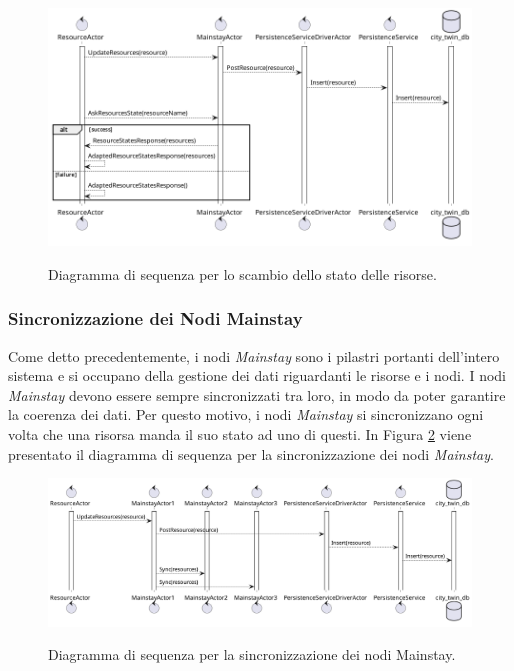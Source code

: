 \documentclass{scrartcl}
\begin{document}
\begin{figure}[H]
    \caption{Diagramma di sequenza per lo scambio dello stato delle risorse.}
    \includegraphics[width=\textwidth]{../assets/images/core-resource-state-exchange-sequence-diagram.png}
    \label{fig:core-resource-state-exchange-sequence-diagram}
\end{figure}

\subsubsection{Sincronizzazione dei Nodi Mainstay}

Come detto precedentemente, i nodi \textit{Mainstay} sono i pilastri portanti dell'intero sistema e si occupano della gestione dei dati riguardanti le risorse e i nodi. I nodi \textit{Mainstay} devono essere sempre sincronizzati tra loro, in modo da poter garantire la coerenza dei dati. Per questo motivo, i nodi \textit{Mainstay} si sincronizzano ogni volta che una risorsa manda il suo stato ad uno di questi. In Figura \ref{fig:core-mainstays-sync-sequence-diagram} viene presentato il diagramma di sequenza per la sincronizzazione dei nodi \textit{Mainstay}.

\begin{figure}[H]
    \caption{Diagramma di sequenza per la sincronizzazione dei nodi Mainstay.}
    \includegraphics[width=\textwidth]{../assets/images/core-mainstays-sync-sequence-diagram.png}
    \label{fig:core-mainstays-sync-sequence-diagram}
\end{figure}
\end{document}
